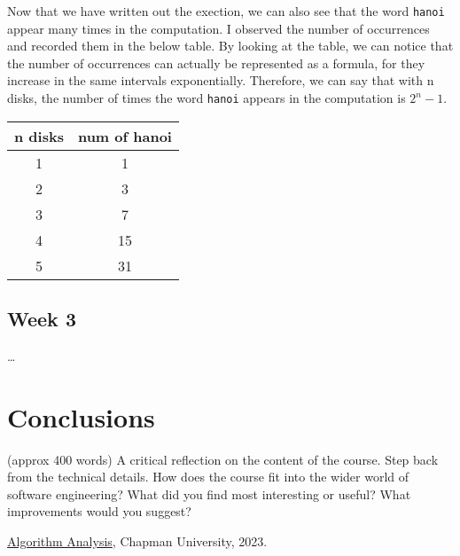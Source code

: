 \documentclass{article}
\theoremstyle{theorem}
\theoremstyle{definition}
\theoremstyle{remark}
\begin{document}
Now that we have written out the exection, we can also see that the word \texttt{hanoi} appear many times in the computation. I observed the number of occurrences and recorded them in the below table. By looking at the table, we can notice that the
number of occurrences can actually be represented as a formula, for they increase in the same intervals exponentially. Therefore, we can say that with n disks, the number of times the word \texttt{hanoi} appears in the computation is \(2^n - 1\). 
\begin{center}
  \begin{tabular}{|c c|}
    \hline
    n disks & num of hanoi \\
    \hline 
    1 & 1 \\
    \hline 
    2 & 3 \\
    \hline 
    3 & 7 \\
    \hline 
    4 & 15 \\
    \hline 
    5 & 31 \\
    \hline
  \end{tabular}
\end{center}

\subsection{Week 3}

\ldots

\section{Conclusions}\label{conclusions}

(approx 400 words) A critical reflection on the content of the course. Step back from the technical details. How does the course fit into the wider world of software engineering? What did you find most interesting or useful? What improvements would you suggest?

\begin{thebibliography}{99}
 \href{https://github.com/alexhkurz/algorithm-analysis-2023}{Algorithm Analysis}, Chapman University, 2023.
\end{thebibliography}
\end{document}
